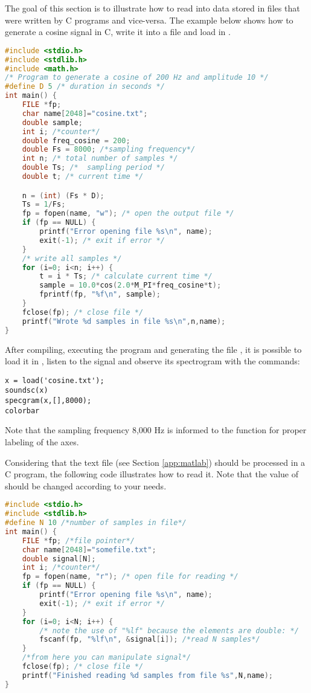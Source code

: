 The goal of this section is to illustrate how to read into {\matlab} data stored in files that were written by C programs and vice-versa. The example below shows how to generate a cosine signal in C, write it into a file and load in \matlab. 
\begin{lstlisting}[language=c]
#include <stdio.h>
#include <stdlib.h>
#include <math.h>
/* Program to generate a cosine of 200 Hz and amplitude 10 */
#define D 5 /* duration in seconds */
int main() {
	FILE *fp;
	char name[2048]="cosine.txt";
	double sample;
	int i; /*counter*/
	double freq_cosine = 200;
	double Fs = 8000; /*sampling frequency*/
	int n; /* total number of samples */
	double Ts; /*  sampling period */
	double t; /* current time */

	n = (int) (Fs * D);
	Ts = 1/Fs;	
	fp = fopen(name, "w"); /* open the output file */	
	if (fp == NULL) {		
		printf("Error opening file %s\n", name);
		exit(-1); /* exit if error */
	}
	/* write all samples */
	for (i=0; i<n; i++) {
		t = i * Ts; /* calculate current time */
		sample = 10.0*cos(2.0*M_PI*freq_cosine*t);
		fprintf(fp, "%f\n", sample); 
	}
	fclose(fp); /* close file */
	printf("Wrote %d samples in file %s\n",n,name);
}
\end{lstlisting}

After compiling, executing the program and generating the file , it is possible to load it in \matlab, listen to the signal and observe its spectrogram with the commands:
\begin{lstlisting}
x = load('cosine.txt');
soundsc(x)
specgram(x,[],8000);
colorbar
\end{lstlisting}
Note that the sampling frequency 8,000 Hz is informed to the  function for proper labeling of the axes.

Considering that the text file  (see Section \ref{app:matlab}) should be processed in a C program, the following code illustrates how to read it. Note that the value of  should be changed according to your needs.
\begin{lstlisting}[language=c]
#include <stdio.h>
#include <stdlib.h>
#define N 10 /*number of samples in file*/
int main() {
	FILE *fp; /*file pointer*/
	char name[2048]="somefile.txt";
	double signal[N];
	int i; /*counter*/	
	fp = fopen(name, "r"); /* open file for reading */
	if (fp == NULL) {		
		printf("Error opening file %s\n", name);
		exit(-1); /* exit if error */
	}	
	for (i=0; i<N; i++) {
		/* note the use of "%lf" because the elements are double: */
		fscanf(fp, "%lf\n", &signal[i]); /*read N samples*/
	}
	/*from here you can manipulate signal*/
	fclose(fp); /* close file */
	printf("Finished reading %d samples from file %s",N,name);
}
\end{lstlisting}

